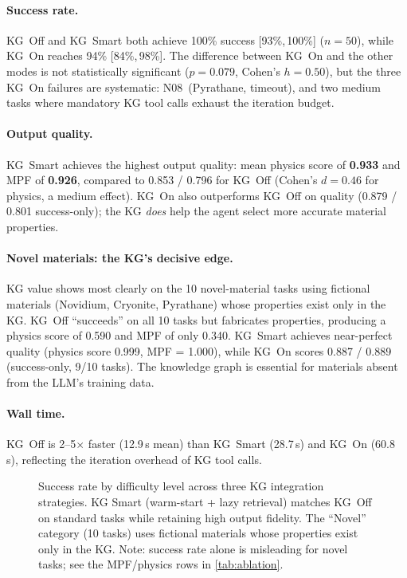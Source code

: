 \documentclass[twocolumn]{article}
\begin{document}


\paragraph{Success rate.}
KG~Off and KG~Smart both achieve 100\% success [93\%,\,100\%]
($n{=}50$), while KG~On reaches 94\% [84\%,\,98\%].  The difference
between KG~On and the other modes is not statistically significant
($p = 0.079$, Cohen's $h = 0.50$), but the three KG~On failures are
systematic:
N08~(Pyrathane, timeout), and two medium tasks where mandatory KG
tool calls exhaust the iteration budget.

\paragraph{Output quality.}
KG~Smart achieves the highest output quality: mean physics score of
\textbf{0.933} and MPF of \textbf{0.926}, compared to 0.853 / 0.796 for
KG~Off (Cohen's $d = 0.46$ for physics, a medium effect).
KG~On also outperforms KG~Off on quality (0.879 / 0.801 success-only);
the KG \emph{does} help the agent select more accurate material properties.

\paragraph{Novel materials: the KG's decisive edge.}
KG value shows most clearly on the 10 novel-material
tasks using fictional materials (Novidium, Cryonite, Pyrathane) whose
properties exist only in the KG.  KG~Off ``succeeds'' on all 10 tasks
but fabricates properties, producing a physics score of 0.590 and MPF of
only 0.340.  KG~Smart achieves near-perfect quality (physics score
0.999, MPF = 1.000), while KG~On scores 0.887 / 0.889 (success-only,
9/10 tasks).  The knowledge graph is essential for materials absent
from the LLM's training data.

\paragraph{Wall time.}
KG~Off is 2--5$\times$ faster (12.9\,s mean) than KG~Smart (28.7\,s)
and KG~On (60.8\,s), reflecting the iteration overhead of KG tool calls.

\begin{figure}[htbp]
  \centering
  
  \caption{Success rate by difficulty level across three KG integration
    strategies.  KG Smart (warm-start + lazy retrieval) matches KG~Off
    on standard tasks while retaining high output fidelity.
    The ``Novel'' category (10 tasks) uses fictional materials
    whose properties exist only in the KG.  Note: success rate alone
    is misleading for novel tasks; see the MPF/physics rows in
    \cref{tab:ablation}.}
  \label{fig:ablation}
\end{figure}
\end{document}
